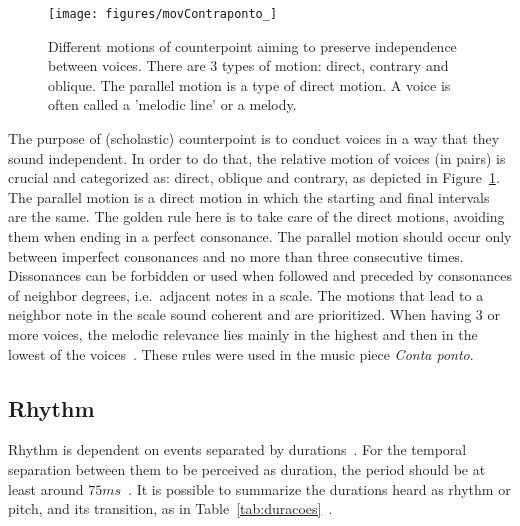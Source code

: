 \begin{figure}[h!]
    \centering
        \texttt{[image: figures/movContraponto\_]}
    \caption{Different motions of counterpoint aiming to preserve independence
        between voices. There are 3 types of motion: direct, contrary and
        oblique. The parallel motion is a type of direct motion.
	A voice is often called a 'melodic line' or a melody.}
        \label{fig:movContraponto}
\end{figure}

The purpose of (scholastic) counterpoint is to conduct voices in a way that they sound independent. In order to do that, the relative motion of voices (in pairs) is crucial and
categorized as: direct, oblique and contrary, as depicted in Figure~\ref{fig:movContraponto}.
The parallel motion is a direct motion in which the starting and final intervals are the same.
The golden rule here is to take care of the direct motions, avoiding them
when ending in a perfect consonance. The parallel motion should occur only between
imperfect consonances and no more than three consecutive times. Dissonances can be forbidden or used when followed and preceded by consonances of neighbor
degrees, i.e.\ adjacent notes in a scale. The motions that lead to a
neighbor note in the scale sound coherent and are prioritized. When having 3 or more voices, the melodic
relevance lies mainly in the highest and then in the lowest of the voices~\cite{Fux,Tragtenberg,SchoenbergContra}.
These rules were used in the music piece \emph{Conta ponto}.~\cite{MASSA}

\subsection{Rhythm}\label{subsec:ritmo}
Rhythm is dependent on events separated by durations~\cite{Lacerda}.
For the temporal separation between them to be perceived as duration,
the period should be at least around $75ms$~\cite{microsound}.
It is possible to summarize the durations heard as rhythm or pitch, and its transition,
as in Table~\ref{tab:duracoes}~\cite{Alfaix, microsound}.

